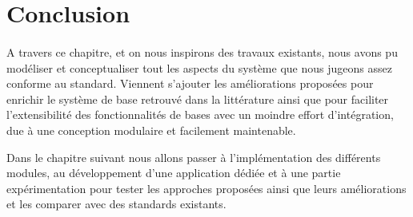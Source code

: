 \section{Conclusion}
\paragraph{}
A travers ce chapitre, et on nous inspirons des travaux existants, nous avons pu modéliser et conceptualiser tout les aspects du système que nous jugeons assez conforme au standard. Viennent s'ajouter les améliorations proposées pour enrichir le système de base retrouvé dans la littérature ainsi que pour faciliter l'extensibilité des fonctionnalités de bases avec un moindre effort d'intégration, due à une conception modulaire et facilement maintenable. 
\par Dans le chapitre suivant nous allons passer à l'implémentation des différents modules, au développement d'une application dédiée et à une partie expérimentation pour tester les approches proposées ainsi que leurs améliorations et les comparer avec des standards existants.



% 
% 

